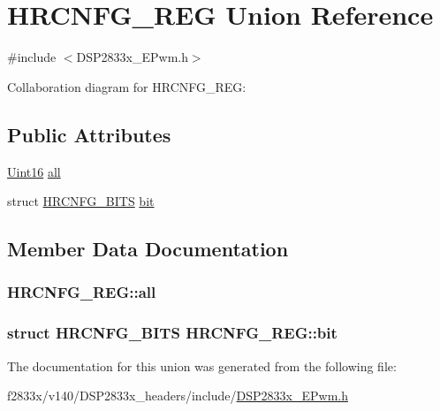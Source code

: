 \hypertarget{union_h_r_c_n_f_g___r_e_g}{}\section{H\+R\+C\+N\+F\+G\+\_\+\+R\+E\+G Union Reference}
\label{union_h_r_c_n_f_g___r_e_g}


{\ttfamily \#include $<$D\+S\+P2833x\+\_\+\+E\+Pwm.\+h$>$}



Collaboration diagram for H\+R\+C\+N\+F\+G\+\_\+\+R\+E\+G\+:
\subsection*{Public Attributes}
\begin{DoxyCompactItemize}
\item 
\hyperlink{_d_s_p2833x___device_8h_a59a9f6be4562c327cbfb4f7e8e18f08b}{Uint16} \hyperlink{union_h_r_c_n_f_g___r_e_g_a7794277ca46525639c0401b1b6668a97}{all}
\item 
struct \hyperlink{struct_h_r_c_n_f_g___b_i_t_s}{H\+R\+C\+N\+F\+G\+\_\+\+B\+I\+T\+S} \hyperlink{union_h_r_c_n_f_g___r_e_g_a74e926c24616efbdec32b12038e81212}{bit}
\end{DoxyCompactItemize}


\subsection{Member Data Documentation}
\hypertarget{union_h_r_c_n_f_g___r_e_g_a7794277ca46525639c0401b1b6668a97}{}
\subsubsection[{all}]{ H\+R\+C\+N\+F\+G\+\_\+\+R\+E\+G\+::all}\label{union_h_r_c_n_f_g___r_e_g_a7794277ca46525639c0401b1b6668a97}
\hypertarget{union_h_r_c_n_f_g___r_e_g_a74e926c24616efbdec32b12038e81212}{}
\subsubsection[{bit}]{\setlength{\rightskip}{0pt plus 5cm}struct {\bf H\+R\+C\+N\+F\+G\+\_\+\+B\+I\+T\+S} H\+R\+C\+N\+F\+G\+\_\+\+R\+E\+G\+::bit}\label{union_h_r_c_n_f_g___r_e_g_a74e926c24616efbdec32b12038e81212}


The documentation for this union was generated from the following file\+:\begin{DoxyCompactItemize}
\item 
f2833x/v140/\+D\+S\+P2833x\+\_\+headers/include/\hyperlink{_d_s_p2833x___e_pwm_8h}{D\+S\+P2833x\+\_\+\+E\+Pwm.\+h}\end{DoxyCompactItemize}
